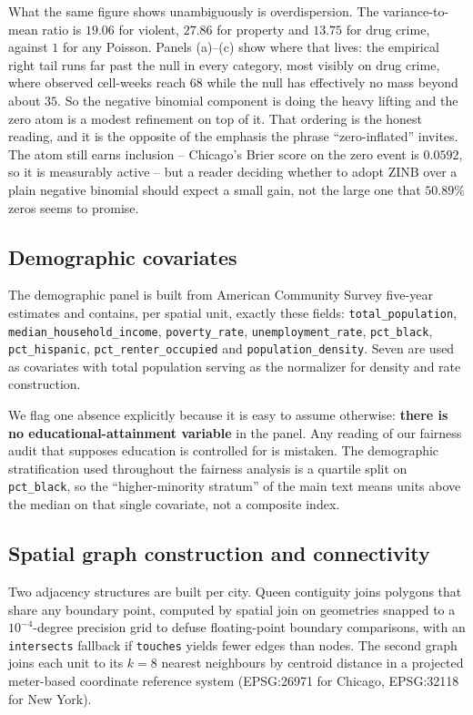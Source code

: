 \documentclass[journal,10pt,onecolumn]{IEEEtran}
\begin{document}
What the same figure shows unambiguously is overdispersion. The variance-to-mean
ratio is $19.06$ for violent, $27.86$ for property and $13.75$ for drug crime,
against $1$ for any Poisson. Panels (a)--(c) show where that lives: the empirical
right tail runs far past the null in every category, most visibly on drug crime,
where observed cell-weeks reach $68$ while the null has effectively no mass beyond
about $35$. So the negative binomial component is doing the heavy lifting and the
zero atom is a modest refinement on top of it. That ordering is the honest reading,
and it is the opposite of the emphasis the phrase ``zero-inflated'' invites. The
atom still earns inclusion -- Chicago's Brier score on the zero event is $0.0592$,
so it is measurably active -- but a reader deciding whether to adopt ZINB over a
plain negative binomial should expect a small gain, not the large one that
$50.89\%$ zeros seems to promise.

\subsection{Demographic covariates}

The demographic panel is built from American Community Survey five-year estimates
and contains, per spatial unit, exactly these fields:
\texttt{total\_population}, \texttt{median\_household\_income},
\texttt{poverty\_rate}, \texttt{unemployment\_rate}, \texttt{pct\_black},
\texttt{pct\_hispanic}, \texttt{pct\_renter\_occupied} and
\texttt{population\_density}. Seven are used as covariates with total population
serving as the normalizer for density and rate construction.

We flag one absence explicitly because it is easy to assume otherwise:
\textbf{there is no educational-attainment variable} in the panel. Any reading of
our fairness audit that supposes education is controlled for is mistaken. The
demographic stratification used throughout the fairness analysis is a quartile
split on \texttt{pct\_black}, so the ``higher-minority stratum'' of the main text
means units above the median on that single covariate, not a composite index.

\subsection{Spatial graph construction and connectivity}

Two adjacency structures are built per city. Queen contiguity joins polygons that
share any boundary point, computed by spatial join on geometries snapped to a
$10^{-4}$-degree precision grid to defuse floating-point boundary comparisons,
with an \texttt{intersects} fallback if \texttt{touches} yields fewer edges than
nodes. The second graph joins each unit to its $k = 8$ nearest neighbours by
centroid distance in a projected meter-based coordinate reference system
(EPSG:26971 for Chicago, EPSG:32118 for New York).
\end{document}

